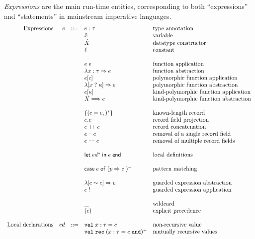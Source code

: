 \documentclass{article}
\newcommand{\cd}[1]{\texttt{#1}}
\newcommand{\mt}[1]{\mathsf{#1}}
\newcommand{\rc}{+ \hspace{-.075in} + \;}
\newcommand{\rcut}{\; \texttt{--} \;}
\newcommand{\rcutM}{\; \texttt{---} \;}
\begin{document}
\emph{Expressions} are the main run-time entities, corresponding to both ``expressions'' and ``statements'' in mainstream imperative languages.
$$\begin{array}{rrcll}
  \textrm{Expressions} & e &::=& e : \tau & \textrm{type annotation} \\
  &&& \hat{x} & \textrm{variable} \\
  &&& \hat{X} & \textrm{datatype constructor} \\
  &&& \ell & \textrm{constant} \\
  \\
  &&& e \; e & \textrm{function application} \\
  &&& \lambda x : \tau \Rightarrow e & \textrm{function abstraction} \\
  &&& e [c] & \textrm{polymorphic function application} \\
  &&& \lambda [x \; ? \; \kappa] \Rightarrow e & \textrm{polymorphic function abstraction} \\
  &&& e [\kappa] & \textrm{kind-polymorphic function application} \\
  &&& X \Longrightarrow e & \textrm{kind-polymorphic function abstraction} \\
  \\
  &&& \{(c = e,)^*\} & \textrm{known-length record} \\
  &&& e.c & \textrm{record field projection} \\
  &&& e \rc e & \textrm{record concatenation} \\
  &&& e \rcut c & \textrm{removal of a single record field} \\
  &&& e \rcutM c & \textrm{removal of multiple record fields} \\
  \\
  &&& \mt{let} \; ed^* \; \mt{in} \; e \; \mt{end} & \textrm{local definitions} \\
  \\
  &&& \mt{case} \; e \; \mt{of} \; (p \Rightarrow e|)^+ & \textrm{pattern matching} \\
  \\
  &&& \lambda [c \sim c] \Rightarrow e & \textrm{guarded expression abstraction} \\
  &&& e \; ! & \textrm{guarded expression application} \\
  \\
  &&& \_ & \textrm{wildcard} \\
  &&& (e) & \textrm{explicit precedence} \\
  \\
  \textrm{Local declarations} & ed &::=& \cd{val} \; x : \tau = e & \textrm{non-recursive value} \\
  &&& \cd{val} \; \cd{rec} \; (x : \tau = e \; \cd{and})^+ & \textrm{mutually recursive values} \\
\end{array}$$
\end{document}
